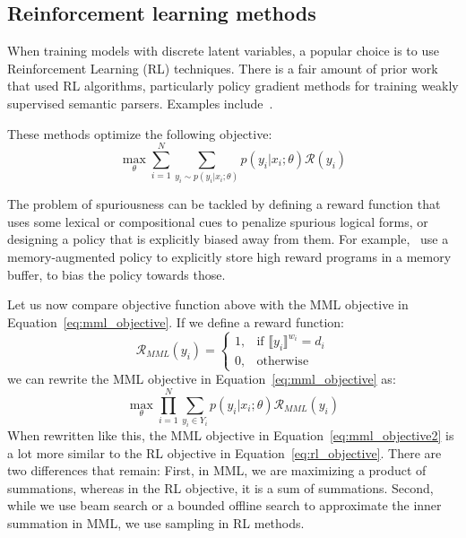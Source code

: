 \subsection{Reinforcement learning methods}
When training models with discrete latent variables, a popular choice is to use
Reinforcement Learning (RL) techniques. There is a fair amount of prior work that
used RL algorithms, particularly policy gradient methods for training weakly
supervised semantic parsers. Examples
include~\cite{Andreas2016LearningTC,Liang2016NeuralSM,guu2017bridging,liang2018memory}.

These methods optimize the following objective:
\begin{equation}
	\max_{\theta} \sum_{i=1}^N \sum_{y_i \sim p(y_i|x_i;\theta)} p(y_i|x_i;\theta) \mathcal{R}(y_i)
	\label{eq:rl_objective}
\end{equation}

The problem of spuriousness can be tackled by defining a reward
function that uses some lexical or compositional cues to penalize spurious
logical forms, or designing a policy that is explicitly biased away from them.
For example,~\cite{liang2018memory} use a memory-augmented policy to explicitly store high
reward programs in a memory buffer, to bias the policy towards those.

Let us now compare objective function above with the MML objective in
Equation~\ref{eq:mml_objective}. If we define a reward function:
\begin{equation}
	\mathcal{R}_{MML}(y_i) = 
	\begin{cases}
		1, & \text{if } \llbracket y_i \rrbracket^{w_i} = d_i\\
		0, & \text{otherwise}
	\end{cases}
	\label{eq:mml_reward}
\end{equation}
we can rewrite the MML objective in Equation~\ref{eq:mml_objective} as:
\begin{equation}	
	\max_{\theta} \prod_{i=1}^N \sum_{y_i \in Y_i} p(y_i|x_i;\theta)
	\mathcal{R}_{MML}(y_i)
	\label{eq:mml_objective2}
\end{equation}
When rewritten like this, the MML objective in Equation~\ref{eq:mml_objective2} is a lot more
similar to the RL objective in Equation~\ref{eq:rl_objective}. There are two
differences that remain: First, in MML, we are maximizing a product of summations,
whereas in the RL objective, it is a sum of summations. Second, while we use
beam search or a bounded offline search to approximate the inner summation in
MML, we use sampling in RL methods.

